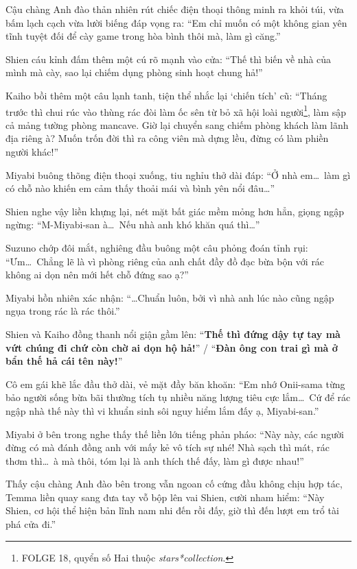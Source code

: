 \documentclass[../main.tex]{subfiles}
\begin{document}
Cậu chàng Anh đào thản nhiên rút chiếc điện thoại thông minh ra khỏi túi, vừa bấm lạch cạch vừa lười biếng đáp vọng ra: ``Em chỉ muốn có một không gian yên tĩnh tuyệt đối để cày game trong hòa bình thôi mà, làm gì căng.''


Shien cáu kỉnh đấm thêm một cú rõ mạnh vào cửa: ``Thế thì biến về nhà của mình mà cày, sao lại chiếm dụng phòng sinh hoạt chung hả!''

Kaiho bồi thêm một câu lạnh tanh, tiện thể nhắc lại `chiến tích' cũ: ``Tháng trước thì chui rúc vào thùng rác đòi làm ốc sên từ bỏ xã hội loài người\footnote{{\humanist FOLGE 18}, quyển số Hai thuộc \textit{stars*collection}.}, làm sập cả mảng tường phòng mancave. Giờ lại chuyển sang chiếm phòng khách làm lãnh địa riêng à? Muốn trốn đời thì ra công viên mà dựng lều, đừng có làm phiền người khác!''

Miyabi buông thõng điện thoại xuống, tiu nghỉu thở dài đáp: ``Ở nhà em\dots\ làm gì có chỗ nào khiến em cảm thấy thoải mái và bình yên nổi đâu\dots''

Shien nghe vậy liền khựng lại, nét mặt bất giác mềm mỏng hơn hẳn, giọng ngập ngừng: ``M-Miyabi-san à\dots\ Nếu nhà anh khó khăn quá thì\dots''

Suzuno chớp đôi mắt, nghiêng đầu buông một câu phỏng đoán tỉnh rụi: ``Ưm\dots\ Chẳng lẽ là vì phòng riêng của anh chất đầy đồ đạc bừa bộn với rác không ai dọn nên mới hết chỗ đứng sao ạ?''

Miyabi hồn nhiên xác nhận: ``\dots Chuẩn luôn, bởi vì nhà anh lúc nào cũng ngập ngụa trong rác là rác thôi.''


Shien và Kaiho đồng thanh nổi giận gầm lên: ``\textbf{Thế thì đứng dậy tự tay mà vứt chúng đi chứ còn chờ ai dọn hộ hả!}'' / ``\textbf{Đàn ông con trai gì mà ở bẩn thế hả cái tên này!}''

Cô em gái khẽ lắc đầu thở dài, vẻ mặt đầy băn khoăn: ``Em nhớ Onii-sama từng bảo người sống bừa bãi thường tích tụ nhiều năng lượng tiêu cực lắm\dots\ Cứ để rác ngập nhà thế này thì vi khuẩn sinh sôi nguy hiểm lắm đấy ạ, Miyabi-san.''

Miyabi ở bên trong nghe thấy thế liền lớn tiếng phản pháo: ``Này này, các người đừng có mà đánh đồng anh với mấy kẻ vô tích sự nhé! Nhà sạch thì mát, rác thơm thì\dots\ à mà thôi, tóm lại là anh thích thế đấy, làm gì được nhau!''

Thấy cậu chàng Anh đào bên trong vẫn ngoan cố cứng đầu không chịu hợp tác, Temma liền quay sang đưa tay vỗ bộp lên vai Shien, cười nham hiểm: ``Này Shien, cơ hội thể hiện bản lĩnh nam nhi đến rồi đấy, giờ thì đến lượt em trổ tài phá cửa đi.''
\end{document}
